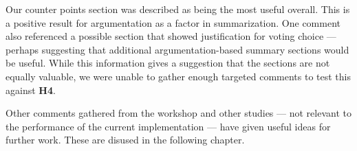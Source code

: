       Our counter points section was described as being the most useful overall. This is a positive result for argumentation as a factor in summarization. One comment also referenced a possible section that showed justification for voting choice --- perhaps suggesting that additional argumentation-based summary sections would be useful. While this information gives a suggestion that the sections are not equally valuable, we were unable to gather enough targeted comments to test this against \textbf{H4}.

      Other comments gathered from the workshop and other studies --- not relevant to the performance of the current implementation --- have given useful ideas for further work. These are disused in the following chapter.
